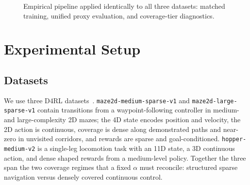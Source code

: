 \documentclass[conference]{IEEEtran}
\begin{document}
\begin{figure}[t]
\centering
{}
\caption{Empirical pipeline applied identically to all three datasets:
matched training, unified proxy evaluation, and coverage-tier diagnostics.}
\label{fig:pipeline}
\end{figure}

\section{Experimental Setup}
\label{sec:setup}

\subsection{Datasets}

We use three D4RL datasets~\cite{fu2020d4rl}.
\texttt{maze2d-medium-sparse-v1} and \texttt{maze2d-large-sparse-v1} contain
transitions from a waypoint-following controller in medium- and
large-complexity 2D mazes; the 4D state encodes position and velocity, the
2D action is continuous, coverage is dense along demonstrated paths and
near-zero in unvisited corridors, and rewards are sparse and
goal-conditioned. \texttt{hopper-medium-v2} is a single-leg locomotion task
with an 11D state, a 3D continuous action, and dense shaped rewards from a
medium-level policy. Together the three span the two coverage regimes that a
fixed $\alpha$ must reconcile: structured sparse navigation versus densely
covered continuous control.
\end{document}

